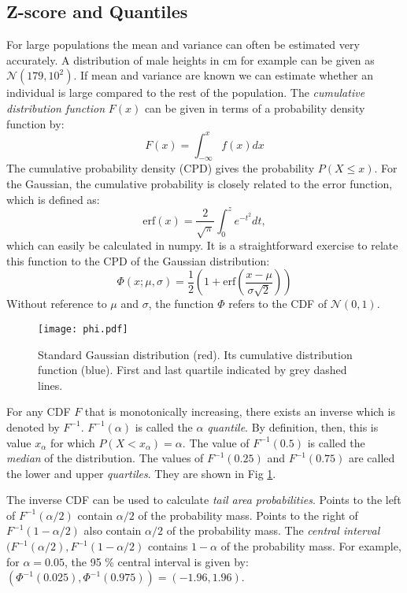   \subsection{Z-score and Quantiles}
  For large populations the mean and variance can often be estimated  very accurately. A distribution of male heights in cm for example
  can be given as $\mathcal{N}(179,10^2)$. If mean and variance are known we can estimate whether an individual is large compared to
  the rest of the population. The \emph{cumulative distribution function} $F(x)$ can be given in terms of a probability density function by:
  $$
  F(x) = \int^x_{-\infty} f(x) dx
  $$
  The cumulative probability density (CPD) gives the probability $P(X \le x)$. For the Gaussian, the cumulative probability is closely related
  to the error function, which is defined as:
  \begin{equation}
    \mbox{erf}(x) = \frac{2}{\sqrt{\pi}} \int^z_0 e^{-t^2} dt,
  \end{equation}
  which can easily be calculated in numpy.
  It is a straightforward exercise to relate this function to the CPD of the Gaussian distribution:
  \begin{equation}
    \Phi(x ; \mu, \sigma ) = \frac{1}{2} \left( 1 + \mbox{erf}\left( \frac{ x - \mu }{\sigma \sqrt{2}} \right) \right)
  \end{equation}
  Without reference to $\mu$ and $\sigma$, the function $\Phi$ refers to the CDF of $\mathcal{N}(0,1)$.

\begin{figure}[!ht]
\begin{center}
\texttt{[image: phi.pdf]}
\end{center}
\caption{Standard Gaussian distribution (red). Its cumulative distribution function (blue). First and last quartile indicated by grey dashed lines.}
\label{fig-cdf}
\end{figure}
  
  For any CDF $F$ that is monotonically increasing, there exists an inverse which is denoted by $F^{-1}$.  $F^{-1}(\alpha)$ is called
  the $\alpha$ \emph{quantile}. By definition, then, this is value $x_{\alpha}$ for which $P(X < x_{\alpha}) = \alpha$.
  The value of $F^{-1}(0.5)$ is called the \emph{median} of the distribution. The values of $F^{-1}(0.25)$ and $F^{-1}(0.75)$ are called
  the lower and upper \emph{quartiles}. They are shown in Fig \ref{fig-cdf}.

  The inverse CDF can be used to calculate \emph{tail area probabilities}. Points to the left of $F^{-1}(\alpha/2)$ contain $\alpha/2$
  of the probability mass. Points to the right of $F^{-1}(1 - \alpha /2)$ also contain $\alpha /2$ of the probability mass. The \emph{central interval}
  $(F^{-1}(\alpha/2), F^{-1}(1 - \alpha/2)$ contains $1 - \alpha$ of the probability mass. For example, for $\alpha = 0.05$, the 95 \% central interval
  is given by: $(\Phi^{-1}(0.025), \Phi^{-1}(0.975)) = (-1.96, 1.96)$.

